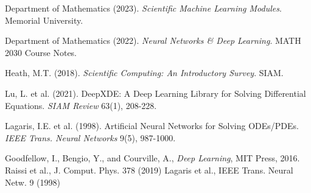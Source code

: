 \documentclass{article}
\begin{document}
\begin{thebibliography}{15}
 Department of Mathematics (2023). \textit{Scientific Machine Learning Modules}. Memorial University.

 Department of Mathematics (2022). \textit{Neural Networks \& Deep Learning}. MATH 2030 Course Notes.

 Heath, M.T. (2018). \textit{Scientific Computing: An Introductory Survey}. SIAM.

 Lu, L. et al. (2021). DeepXDE: A Deep Learning Library for Solving Differential Equations. \textit{SIAM Review} 63(1), 208-228.

 Lagaris, I.E. et al. (1998). Artificial Neural Networks for Solving ODEs/PDEs. \textit{IEEE Trans. Neural Networks} 9(5), 987-1000.

 Goodfellow, I., Bengio, Y., and Courville, A., \textit{Deep Learning}, MIT Press, 2016.
 Raissi et al., J. Comput. Phys. 378 (2019)
 Lagaris et al., IEEE Trans. Neural Netw. 9 (1998)
\end{thebibliography}
\end{document}
